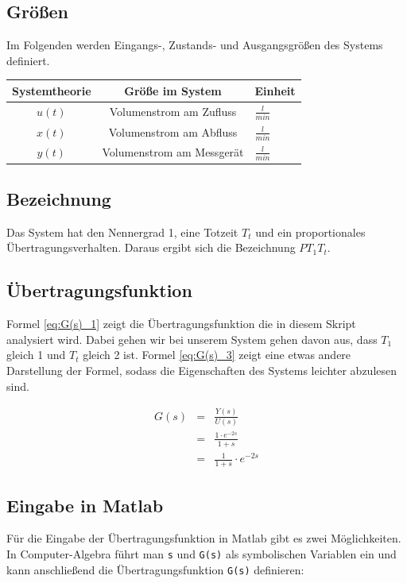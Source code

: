 \subsection{Größen}
Im Folgenden werden Eingangs-, Zustands- und Ausgangsgrößen des Systems definiert.
\renewcommand{\arraystretch}{1.5}
\begin{center}
    \begin{tabular}{ c|c|l } 
    Systemtheorie  & Größe im System & Einheit \\
    \hline
    $u(t)$ & Volumenstrom am Zufluss & $\frac{l}{min}$ \\ 
    $x(t)$ & Volumenstrom am Abfluss &  $\frac{l}{min}$\\ 
    $y(t)$ & Volumenstrom am Messgerät & $\frac{l}{min}$ \\ 
    \end{tabular}
\end{center}


\subsection{Bezeichnung}
Das System hat den Nennergrad 1, eine Totzeit $T_t$ und ein proportionales Übertragungsverhalten. Daraus ergibt sich die Bezeichnung $PT_{1}T_{t}$.

\subsection{Übertragungsfunktion}

Formel \ref{eq:G(s)_1} zeigt die Übertragungsfunktion die in diesem Skript analysiert wird. Dabei gehen wir bei unserem System gehen davon aus, dass $T_1$ gleich 1 und $T_t$ gleich 2 ist. Formel \ref{eq:G(s)_3} zeigt eine etwas andere Darstellung der Formel, sodass die Eigenschaften des Systems leichter abzulesen sind.

\begin{eqnarray}
    \label{eq:G(s)_1}
    G(s) &=& \frac{Y(s)}{U(s)} \\
    \label{eq:G(s)_2}
    &=& \frac{1 \cdot e^{-2s}}{1+s} \\
    \label{eq:G(s)_3}
    &=& \frac{1}{1 + s} \cdot e^{-2s}
\end{eqnarray}

\subsection{Eingabe in Matlab}
Für die Eingabe der Übertragungsfunktion in Matlab gibt es zwei Möglichkeiten. \\
In Computer-Algebra führt man \texttt{s} und \texttt{G(s)} als symbolischen Variablen ein und kann anschließend die Übertragungsfunktion \texttt{G(s)} definieren:

